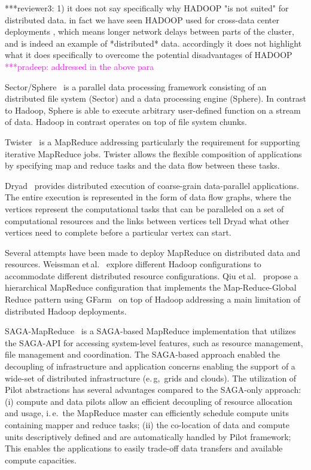 \documentclass{acm_proc_article-sp}
\newcommand{\pnote}[1]{ {\textcolor{magenta} { ***pradeep: #1 }}}
\newcommand{\thirdrev}[1]{ {\textcolor{Bittersweet} { ***reviewer3: #1 }}}
\newcommand{\pnote}[1]{}
\newcommand{\thirdrev}[1]{}
\begin{document}
\thirdrev{1) it does not say specifically why HADOOP "is not suited" for distributed data. in fact we have seen HADOOP used for cross-data center deployments , which means longer network delays between parts of the cluster, and is indeed an example of *distributed* data. accordingly it does not highlight what it does specifically to overcome the potential disadvantages of HADOOP}
\pnote{addressed in the above para} 

Sector/Sphere~\cite{Gu_Grossman_2009} is a parallel data processing framework
consisting of an distributed file system (Sector) and a data processing engine
(Sphere). In contrast to Hadoop, Sphere is able to execute arbitrary 
user-defined function on a stream of data. Hadoop in contrast operates on top 
of file system chunks.

Twister~\cite{Ekanayake:2010:TRI:1851476.1851593} is a 
MapReduce addressing particularly the requirement for supporting iterative 
MapReduce jobs. Twister allows the flexible composition of applications by 
specifying map and reduce tasks and the data flow between these tasks. 

Dryad~\cite{Isard:2007:DDD:1272998.1273005} provides distributed execution of
coarse-grain data-parallel applications. The entire execution is represented in
the form of data flow graphs, where the vertices represent the computational
tasks that can be paralleled on a set of computational resources and the links
between vertices tell Dryad what other vertices need to complete before a
particular vertex can start.

Several attempts have been made to deploy MapReduce on distributed data and
resources. Weissman et\,al.~\cite{weissman-mr-11} explore different Hadoop
configurations to accommodate different distributed resource configurations. 
Qiu et\,al.~\cite{ecmls11-mr-autodock} propose a hierarchical
MapReduce configuration that implements the Map-Reduce-Global Reduce pattern 
using GFarm~\cite{Mikami:2011:UGF:2082076.2082106} on top of Hadoop addressing a 
main limitation of distributed Hadoop deployments. 

SAGA-MapReduce~\cite{Sehgal:2011:UAI:1945091.1945329} is a SAGA-based
MapReduce implementation that utilizes the SAGA-API for accessing system-level
features, such as resource management, file management and coordination. The
SAGA-based approach enabled the decoupling of infrastructure and application
concerns enabling the support of a wide-set of distributed infrastructure
(e.\,g,\ grids and clouds). The utilization of Pilot abstractions has several
advantages compared to the SAGA-only approach: (i) compute and data pilots
allow an efficient decoupling of resource allocation and usage, i.\,e.\ the
MapReduce master can efficiently schedule compute units containing mapper and
reduce tasks; (ii) the co-location of data and compute units descriptively
defined and are automatically handled by Pilot framework; This enables the
applications to easily trade-off data transfers and available compute
capacities.
\end{document}

